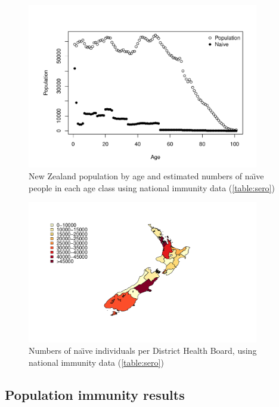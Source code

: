 \documentclass{article}
\begin{document}
\begin{figure}
\begin{center}
     \includegraphics[width=0.9\textwidth]{naive_allPop.pdf}
\end{center}
\caption{New Zealand population by age and estimated numbers of na\"{\i}ve people in each age class using national immunity data (\autoref{table:sero})}
\label{fig:naive}
\end{figure}

\begin{figure}
     \begin{center}
     \includegraphics[width=0.9\textwidth]{naive_map.pdf}
     \end{center}
     \caption{Numbers of na\"{\i}ve individuals per District Health Board, using national immunity data (\autoref{table:sero})}
     \label{fig:naive_map}
\end{figure}

\subsection{Population immunity results}
\label{sub:popim}
\end{document}
